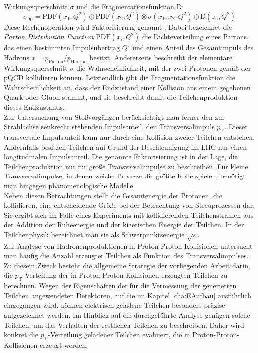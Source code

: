 \documentclass[12pt,a4paper]{report}
\begin{document}
Wirkungsquerschnitt $\sigma$ und die Fragmentationsfunktion $\mathrm{D}$:
\begin{equation}
 \sigma_{\mathrm{pp}} = \mathrm{PDF}(x_1, Q^2) \otimes \mathrm{PDF}(x_2, Q^2) \otimes \sigma(x_1, x_2, Q^2) \otimes \mathrm{D}(z_\mathrm{h}, Q^2) 
\end{equation}
Diese Rechenoperation wird Faktorisierung genannt \cite{Collins:1989gx}. Dabei bezeichnet die \textit{Parton Distribution Function} $\mathrm{PDF}(x_i, Q^2)$ die Dichteverteilung eines Partons, das einen bestimmten Impulsübertrag $Q^2$ und einen Anteil des Gesamtimpuls des Hadrons $x = p_{\mathrm{Parton}}/p_{\mathrm{Hadron}}$ besitzt. Andererseits beschreibt der elementare Wirkungsquerschnitt $\sigma$ die Wahrscheinlichkeit, mit der zwei Protonen gemäß der pQCD kollidieren können. Letztendlich gibt die Fragmentationsfunktion die Wahrscheinlichkeit an, dass der Endzustand einer Kollision aus einem gegebenen Quark oder Gluon stammt, und sie beschreibt damit die Teilchenproduktion dieses Endzustands.\\
Zur Untersuchung von Stoßvorgängen berücksichtigt man ferner den zur Strahlachse senkrecht stehenden Impulsanteil, den Transversalimpuls $p_{\mathrm{T}}$. Dieser transversale Impulsanteil kann nur durch eine Kollision zweier Teilchen entstehen. Andernfalls besitzen Teilchen auf Grund der Beschleunigung im LHC nur einen longitudinalen Impulsanteil. Die genannte Faktorisierung ist in der Lage, die Teilchenproduktion nur für große Transversalimpulse zu beschreiben. Für kleine Transversalimpulse, in denen weiche Prozesse die größte Rolle spielen, benötigt man hingegen phänomenologische Modelle.\\
Neben diesen Betrachtungen stellt die Gesamtenergie der Protonen, die kollidieren, eine entscheidende Größe bei der Betrachtung von Streuprozessen dar. Sie ergibt sich im Falle eines Experiments mit kollidierenden Teilchenstrahlen aus der Addition der Ruheenergie und der kinetischen Energie der Teilchen. In der Teilchenphysik be\-zeichnet man sie als Schwerpunktsenergie $\sqrt{s}$.\\
Zur Analyse von Hadronenproduktionen in Proton-Proton-Kollisionen untersucht man häufig die Anzahl erzeugter Teilchen als Funktion des Transversalimpulses. Zu diesem Zweck besteht die allgemeine Strategie der vorliegenden Arbeit darin, die  $p_{\mathrm{T}}$-Verteilung der in Proton-Proton-Kollisionen erzeugten Teilchen zu berechnen. Wegen der Eigenschaften der für die Vermessung der generierten Teilchen angewendeten Detektoren, auf die im Kapitel \ref{cha:EAufbau} ausführlich eingegangen wird, können elektrisch geladene Teilchen besonders präzise aufgezeichnet werden. Im Hinblick auf die durchgeführte Analyse genügen solche Teilchen, um das Verhalten der restlichen Teilchen zu beschreiben. Daher wird konkret die $p_{\mathrm{T}}$-Verteilung geladener Teilchen evaluiert, die in Proton-Proton-Kollisionen erzeugt werden.
\end{document}
